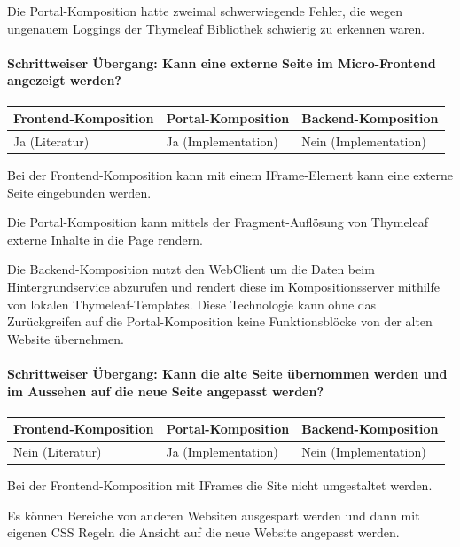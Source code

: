 Die Portal-Komposition hatte zweimal schwerwiegende Fehler, die wegen ungenauem Loggings der Thymeleaf Bibliothek schwierig zu erkennen waren.

\paragraph{Schrittweiser Übergang: Kann eine externe Seite im Micro-Frontend angezeigt werden?}

\begin{tabularx}{\linewidth}{| Y | Y | Y |}
    \hline
    Frontend-Komposition & Portal-Komposition & Backend-Komposition
    \\ \hline
    Ja (Literatur) & Ja (Implementation) & Nein (Implementation) \\ \hline
\end{tabularx}

Bei der Frontend-Komposition kann mit einem IFrame-Element kann eine externe Seite eingebunden werden.

Die Portal-Komposition kann mittels der Fragment-Auflösung von Thymeleaf externe Inhalte in die Page rendern.\cite{thymeleafURLtemplate}

Die Backend-Komposition nutzt den WebClient um die Daten beim Hintergrundservice abzurufen und rendert diese im Kompositionsserver mithilfe von lokalen Thymeleaf-Templates. Diese Technologie kann ohne das Zurückgreifen auf die Portal-Komposition keine Funktionsblöcke von der alten Website übernehmen.

\paragraph{Schrittweiser Übergang: Kann die alte Seite übernommen werden und im Aussehen auf die neue Seite angepasst werden?}

\begin{tabularx}{\linewidth}{| Y | Y | Y |}
    \hline
    Frontend-Komposition & Portal-Komposition & Backend-Komposition
    \\ \hline
    Nein (Literatur) & Ja (Implementation) & Nein (Implementation) \\ \hline
\end{tabularx}

Bei der Frontend-Komposition mit IFrames die Site nicht umgestaltet werden. \cite{mdnIFrame}

Es können Bereiche von anderen Websiten ausgespart werden und dann mit eigenen \ac{CSS} Regeln die Ansicht auf die neue Website angepasst werden.

